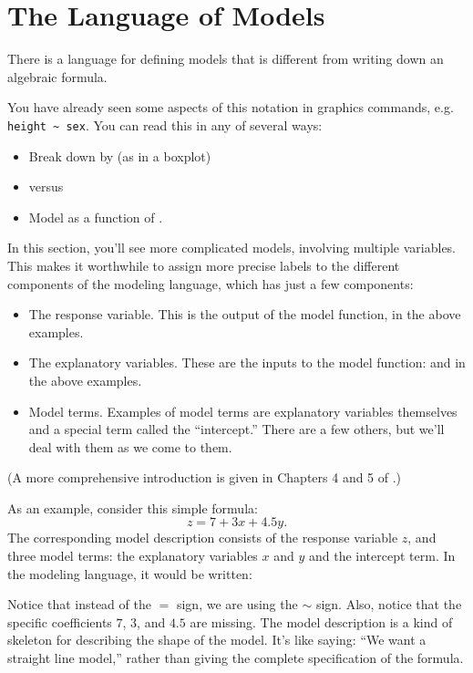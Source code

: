 \section{The Language of Models}
\label{sec:formula}

There is a language for defining models that is different from
writing down an algebraic formula.  

You have already seen some aspects of this notation in graphics
commands, e.g. \verb!height ~ sex!.  You can read this in any of several
ways:
\begin{itemize}
  \item Break down  by  (as in a boxplot)
  \item {} versus 
  \item Model  as a function of .  
\end{itemize}
In this section, you'll see more complicated models, involving
multiple variables.  This makes it worthwhile to assign more precise
labels to the different components of the modeling language, which
has just a few components:
\begin{itemize}
  \item The response variable.  This is the output of the model function,
     in the above examples.
  \item The explanatory variables.  These are the inputs to the
    model function:  and  in the above examples.
  \item Model terms.  Examples of model terms are explanatory
    variables themselves and a special term called the ``intercept.''
    There are a few others, but we'll deal with them as we come to them.
\end{itemize}
(A more comprehensive introduction is given in Chapters 4 and 5 of \cite{kaplan-2009-book}.)


As an example, consider this simple formula:
$$ z = 7 + 3 x + 4.5 y.$$
The corresponding model description consists of the response variable
$z$, and three model terms: the explanatory variables $x$ and
$y$ and the intercept term.  In the modeling language, it would be written:
\begin{quotation}
\centerline{}
\end{quotation}
Notice that instead of the $=$ sign, we are using the $\sim$ sign.
Also, notice that the specific coefficients $7$, $3$, and $4.5$ are
missing.  The model description is a kind of skeleton for describing
the shape of the model.  It's like saying: ``We want a straight line
model,'' rather than giving the complete specification of the formula.

